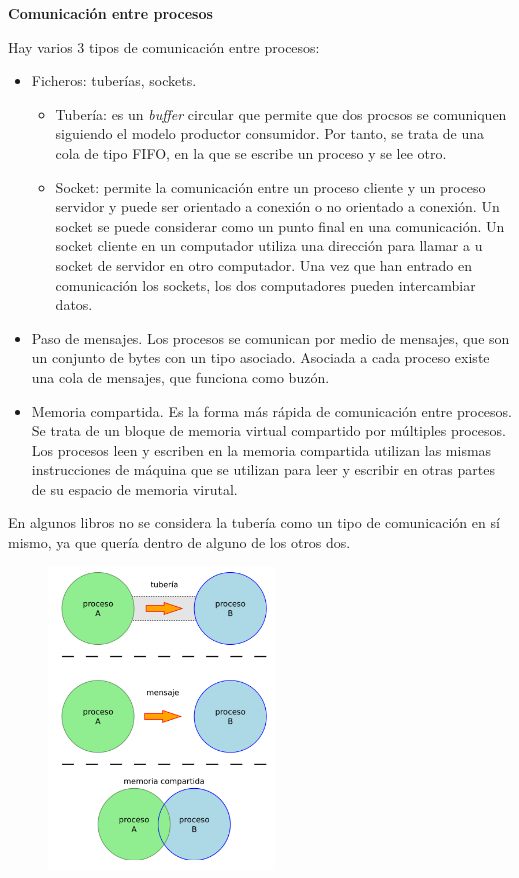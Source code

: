 \documentclass{article}
\begin{document}
\textbf{Comunicación entre procesos}

Hay varios 3 tipos de comunicación entre procesos:

\begin{itemize}
\item Ficheros: tuberías, sockets.
	\begin{itemize}
	\item Tubería: es un \textit{buffer} circular que permite que dos procsos se comuniquen siguiendo el modelo productor consumidor. Por tanto, se trata de una cola de tipo FIFO, en la que se escribe un proceso y se lee otro.
	
	\item Socket: permite la comunicación entre un proceso cliente y un proceso servidor y puede ser orientado a conexión o no orientado a conexión. Un socket se puede considerar como un punto final en una comunicación. Un socket cliente en un computador utiliza una dirección para llamar a u socket de servidor en otro computador. Una vez que han entrado en comunicación los sockets, los dos computadores pueden intercambiar datos.
	\end{itemize}

\item Paso de mensajes. Los procesos se comunican por medio de mensajes, que son un conjunto de bytes con un tipo asociado. Asociada a cada proceso existe una cola de mensajes, que funciona como buzón.

\item Memoria compartida. Es la forma más rápida de comunicación entre procesos. Se trata de un bloque de  memoria virtual compartido por múltiples procesos. Los procesos leen y escriben en la memoria compartida utilizan las mismas instrucciones de máquina que se utilizan para leer y escribir en otras partes de su espacio de memoria virutal.
\end{itemize}

En algunos libros no se considera la tubería como un tipo de comunicación en sí mismo, ya que quería dentro de alguno de los otros dos.

\begin{figure}[h]
\centering
\includegraphics[scale=1, width=60mm]{tipos_com.png}
\end{figure}
\end{document}

